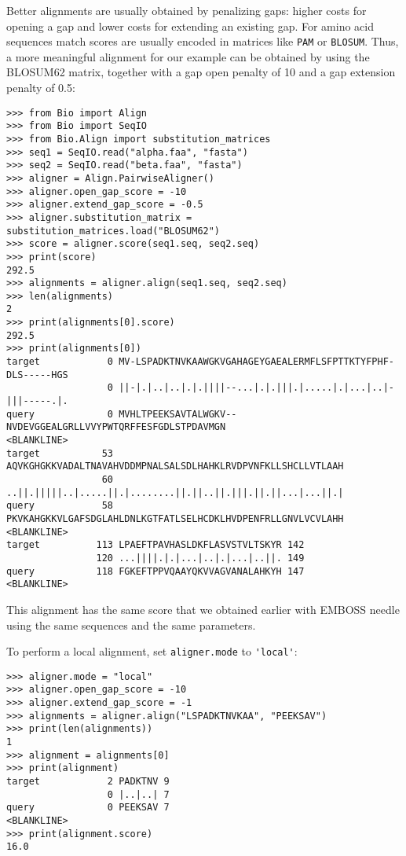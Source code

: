 Better alignments are usually obtained by penalizing gaps: higher costs
for opening a gap and lower costs for extending an existing gap. For amino
acid sequences match scores are usually encoded in matrices like \texttt{PAM}
or \texttt{BLOSUM}. Thus, a more meaningful alignment for our example can be
obtained by using the BLOSUM62 matrix, together with a gap open penalty of 10
and a gap extension penalty of 0.5:

\begin{verbatim}
>>> from Bio import Align
>>> from Bio import SeqIO
>>> from Bio.Align import substitution_matrices
>>> seq1 = SeqIO.read("alpha.faa", "fasta")
>>> seq2 = SeqIO.read("beta.faa", "fasta")
>>> aligner = Align.PairwiseAligner()
>>> aligner.open_gap_score = -10
>>> aligner.extend_gap_score = -0.5
>>> aligner.substitution_matrix = substitution_matrices.load("BLOSUM62")
>>> score = aligner.score(seq1.seq, seq2.seq)
>>> print(score)
292.5
>>> alignments = aligner.align(seq1.seq, seq2.seq)
>>> len(alignments)
2
>>> print(alignments[0].score)
292.5
>>> print(alignments[0])
target            0 MV-LSPADKTNVKAAWGKVGAHAGEYGAEALERMFLSFPTTKTYFPHF-DLS-----HGS
                  0 ||-|.|..|..|.|.||||--...|.|.|||.|.....|.|...|..|-|||-----.|.
query             0 MVHLTPEEKSAVTALWGKV--NVDEVGGEALGRLLVVYPWTQRFFESFGDLSTPDAVMGN
<BLANKLINE>
target           53 AQVKGHGKKVADALTNAVAHVDDMPNALSALSDLHAHKLRVDPVNFKLLSHCLLVTLAAH
                 60 ..||.|||||..|.....||.|........||.||..||.|||.||.||...|...||.|
query            58 PKVKAHGKKVLGAFSDGLAHLDNLKGTFATLSELHCDKLHVDPENFRLLGNVLVCVLAHH
<BLANKLINE>
target          113 LPAEFTPAVHASLDKFLASVSTVLTSKYR 142
                120 ...||||.|.|...|..|.|...|..||. 149
query           118 FGKEFTPPVQAAYQKVVAGVANALAHKYH 147
<BLANKLINE>
\end{verbatim}

This alignment has the same score that we obtained earlier with EMBOSS needle
using the same sequences and the same parameters.

To perform a local alignment, set \verb+aligner.mode+ to \verb+'local'+:

\begin{verbatim}
>>> aligner.mode = "local"
>>> aligner.open_gap_score = -10
>>> aligner.extend_gap_score = -1
>>> alignments = aligner.align("LSPADKTNVKAA", "PEEKSAV")
>>> print(len(alignments))
1
>>> alignment = alignments[0]
>>> print(alignment)
target            2 PADKTNV 9
                  0 |..|..| 7
query             0 PEEKSAV 7
<BLANKLINE>
>>> print(alignment.score)
16.0
\end{verbatim}

